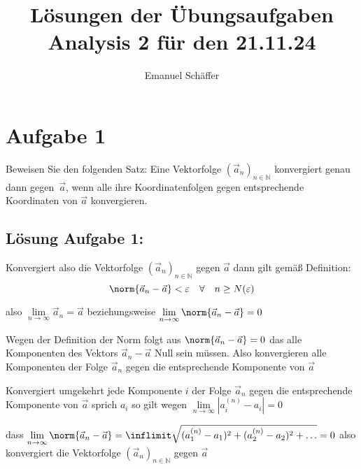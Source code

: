 \documentclass[ngerman, a4paper]{scrartcl}
\begin{document}
	\title{Lösungen der Übungsaufgaben Analysis 2 für den 21.11.24}
	\author{Emanuel Schäffer}
	\maketitle
	
	\section*{Aufgabe 1}
	Beweisen Sie den folgenden Satz: Eine Vektorfolge $(\vec{a}_n)_{n\in \mathbb{N}}$ konvergiert genau dann gegen~$\vec{a}$, wenn alle ihre Koordinatenfolgen gegen entsprechende Koordinaten von $\vec{a}$ konvergieren.
	
	\vspace{0.5cm}
	\subsection*{Lösung Aufgabe 1:}
	
	\noindent Konvergiert also die Vektorfolge $(\vec{a}_n)_{n\in \mathbb{N}}$ gegen $\vec{a}$
	dann gilt gemäß Definition:
	\[\norm{\vec{a}_n - \vec{a}} < \varepsilon \quad \forall \quad n \ge N(\varepsilon)\]
	
	also $\lim\limits_{n\rightarrow\infty} \vec{a}_n = \vec{a}$ beziehungsweise $\lim\limits_{n\rightarrow\infty} \norm{\vec{a}_n - \vec{a}} = 0$ 
	
	\noindent Wegen der Definition der Norm folgt aus $\norm{\vec{a}_n - \vec{a}} = 0$ das alle Komponenten des Vektors $\vec{a}_n - \vec{a}$ Null sein müssen. Also konvergieren alle Komponenten der Folge $\vec{a}_n$ gegen die entsprechende Komponente von $\vec{a}$
	
	\vspace{0.5cm}
	
	Konvergiert umgekehrt jede Komponente $i$ der Folge $\vec{a}_n$ gegen die entsprechende Komponente von  $\vec{a}$ sprich $a_i$ so gilt wegen $\lim\limits_{n\rightarrow\infty}|a_i^{(n)} - a_i| = 0$ 
	
	\noindent dass 
	$\lim\limits_{n\rightarrow\infty}\norm{\vec{a}_n - \vec{a}} = 
	\inflimit \sqrt{(a_1^ {(n)} - a_1)^2 + (a_2^ {(n)} - a_2)^2 + \ldots} = 0$ also konvergiert die Vektorfolge $(\vec{a}_n)_{n\in\mathbb{N}}$ gegen $\vec{a}$

	
\end{document}
